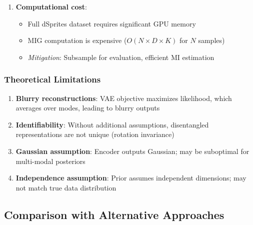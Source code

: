 \documentclass[conference]{IEEEtran}
\begin{document}
\begin{enumerate}
    \item \textbf{Computational cost}:
    \begin{itemize}
        \item Full dSprites dataset requires significant GPU memory
        \item MIG computation is expensive ($O(N \times D \times K)$ for $N$ samples)
        \item \textit{Mitigation}: Subsample for evaluation, efficient MI estimation
    \end{itemize}
\end{enumerate}

\subsubsection{Theoretical Limitations}

\begin{enumerate}
    \item \textbf{Blurry reconstructions}: VAE objective maximizes likelihood, which averages over modes, leading to blurry outputs
    
    \item \textbf{Identifiability}: Without additional assumptions, disentangled representations are not unique (rotation invariance)
    
    \item \textbf{Gaussian assumption}: Encoder outputs Gaussian; may be suboptimal for multi-modal posteriors
    
    \item \textbf{Independence assumption}: Prior assumes independent dimensions; may not match true data distribution
\end{enumerate}

\subsection{Comparison with Alternative Approaches}
\end{document}
